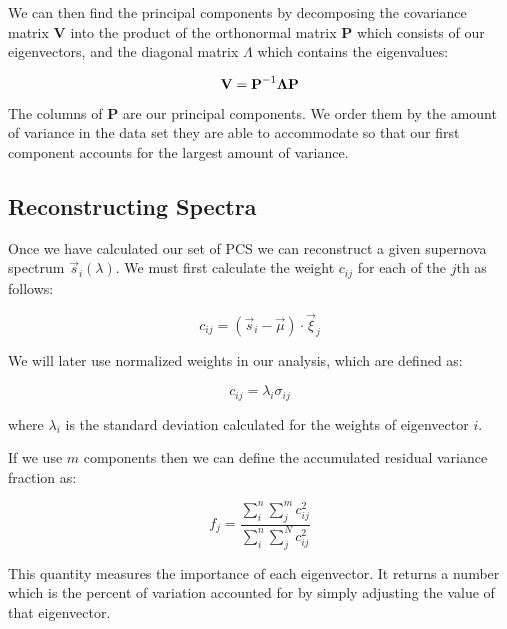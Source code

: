 We can then find the principal components by decomposing the covariance matrix $\textbf{V}$ into the product of the orthonormal matrix $\textbf{P}$ which consists of our eigenvectors, and the diagonal matrix {\boldmath$\Lambda$} which contains the eigenvalues:

$$ \textbf{V} = \textbf{P}^{-1} \mbox{\boldmath$\Lambda$} \textbf{P} $$

The columns of $\textbf{P}$ are our principal components. We order them by the amount of variance in the data set they are able to accommodate so that our first component accounts for the largest amount of variance.

\subsection{Reconstructing Spectra}

Once we have calculated our set of PCS we can reconstruct a given supernova spectrum $\vec{s}_{i}(\lambda)$. We must first calculate the weight $c_{ij}$ for each of the $j$th as follows:

$$ c_{ij} = ( \vec{s}_{i} - \vec{\mu}) \cdot \vec{\xi}_{j} $$

We will later use normalized weights in our analysis, which are defined as:

$$ c_{ij} = \lambda_{i} \sigma_{ij} $$

where $\lambda_{i}$ is the standard deviation calculated for the weights of eigenvector $i$.

If we use $m$ components then we can define the accumulated residual variance fraction as:

$$ f_{j} = \frac{\sum_{i}^{n} \sum_{j}^{m} c_{ij}^{2}}{\sum_{i}^{n} \sum_{j}^{N} c_{ij}^{2}} $$

This quantity measures the importance of each eigenvector. It returns a number which is the percent of variation accounted for by simply adjusting the value of that eigenvector.

